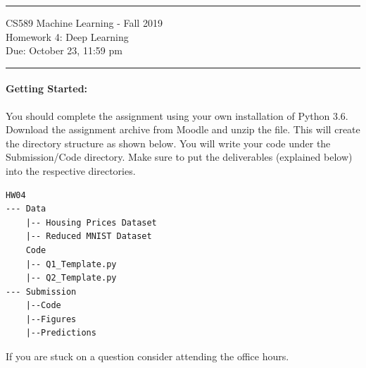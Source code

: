 \documentclass[letterpaper]{article}
\date{Due: October 23, 11:59 pm}
\begin{document}
{\centering
  \rule{6.3in}{2pt}
  \vspace{1em}
  {\Large
    CS589 Machine Learning - Fall 2019 \\
    Homework 4: Deep Learning \\
  }
  \vspace{1em}
  Due: October 23, 11:59 pm \\
  \vspace{0.1em}
  \rule{6.3in}{1.5pt}
}
\vspace{1pc}


\paragraph*{Getting Started:} You should complete the assignment using your own installation of Python 3.6. Download the assignment archive from Moodle and unzip the file. This will create the directory structure as shown below. You will write your code under the Submission/Code directory. Make sure to put the deliverables (explained below) into the respective directories.

\begin{verbatim}
HW04
--- Data
    |-- Housing Prices Dataset
    |-- Reduced MNIST Dataset
    Code
    |-- Q1_Template.py
    |-- Q2_Template.py
--- Submission
    |--Code
    |--Figures    
    |--Predictions
\end{verbatim}

If you are stuck on a question consider attending the office hours.
\end{document}
